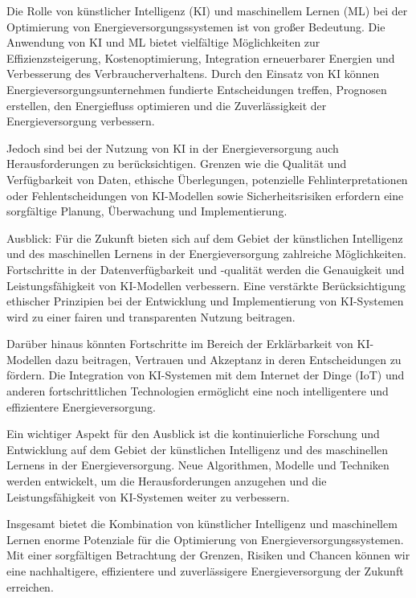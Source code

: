 Die Rolle von künstlicher Intelligenz (KI) und maschinellem Lernen (ML) bei der
Optimierung von Energieversorgungssystemen ist von großer Bedeutung. Die
Anwendung von KI und ML bietet vielfältige Möglichkeiten zur
Effizienzsteigerung, Kostenoptimierung, Integration erneuerbarer Energien und
Verbesserung des Verbraucherverhaltens. Durch den Einsatz von KI können
Energieversorgungsunternehmen fundierte Entscheidungen treffen, Prognosen
erstellen, den Energiefluss optimieren und die Zuverlässigkeit der
Energieversorgung verbessern.

Jedoch sind bei der Nutzung von KI in der Energieversorgung auch
Herausforderungen zu berücksichtigen. Grenzen wie die Qualität und
Verfügbarkeit von Daten, ethische Überlegungen, potenzielle
Fehlinterpretationen oder Fehlentscheidungen von KI-Modellen sowie
Sicherheitsrisiken erfordern eine sorgfältige Planung, Überwachung und
Implementierung.

Ausblick: Für die Zukunft bieten sich auf dem Gebiet der künstlichen
Intelligenz und des maschinellen Lernens in der Energieversorgung zahlreiche
Möglichkeiten. Fortschritte in der Datenverfügbarkeit und -qualität werden die
Genauigkeit und Leistungsfähigkeit von KI-Modellen verbessern. Eine verstärkte
Berücksichtigung ethischer Prinzipien bei der Entwicklung und Implementierung
von KI-Systemen wird zu einer fairen und transparenten Nutzung beitragen.

Darüber hinaus könnten Fortschritte im Bereich der Erklärbarkeit von
KI-Modellen dazu beitragen, Vertrauen und Akzeptanz in deren Entscheidungen zu
fördern. Die Integration von KI-Systemen mit dem Internet der Dinge (IoT) und
anderen fortschrittlichen Technologien ermöglicht eine noch intelligentere und
effizientere Energieversorgung.

Ein wichtiger Aspekt für den Ausblick ist die kontinuierliche Forschung und
Entwicklung auf dem Gebiet der künstlichen Intelligenz und des maschinellen
Lernens in der Energieversorgung. Neue Algorithmen, Modelle und Techniken
werden entwickelt, um die Herausforderungen anzugehen und die
Leistungsfähigkeit von KI-Systemen weiter zu verbessern.

Insgesamt bietet die Kombination von künstlicher Intelligenz und maschinellem
Lernen enorme Potenziale für die Optimierung von Energieversorgungssystemen.
Mit einer sorgfältigen Betrachtung der Grenzen, Risiken und Chancen können wir
eine nachhaltigere, effizientere und zuverlässigere Energieversorgung der
Zukunft erreichen.